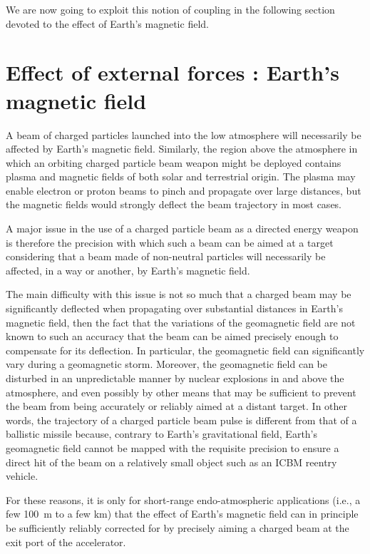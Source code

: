 \documentclass [12pt,a4paper,     ]{report} %
\begin{document}
We are now going to exploit this notion of coupling in the following section devoted to the effect of Earth's magnetic field.



\section{Effect of external forces : Earth's magnetic field}
\label{mag:0}

   A beam of charged particles launched into the low atmosphere will necessarily be affected by Earth's magnetic field.  Similarly, the region above the atmosphere in which an orbiting charged particle beam weapon might be deployed contains plasma and magnetic fields of both solar and terrestrial origin.  The plasma may enable electron or proton beams to pinch and propagate over large distances, but the magnetic fields would strongly deflect the beam trajectory in most cases.


   A major issue in the use of a charged particle beam as a directed energy weapon is therefore the precision with which such a beam can be aimed at a target considering that a beam made of non-neutral particles will necessarily be affected, in a way or another, by Earth's magnetic field. 

   The main difficulty with this issue is not so much that a charged beam may be  significantly deflected when propagating over substantial distances in Earth's magnetic field, then the fact that the variations of the geomagnetic field are not known to such an accuracy that the beam can be aimed precisely enough to compensate for its deflection.  In particular, the geomagnetic field can significantly vary during a geomagnetic storm.  Moreover, the geomagnetic field can be disturbed in an unpredictable manner by nuclear explosions in and above the atmosphere, and even possibly by other means that may be sufficient to prevent the beam from being accurately or reliably aimed at a distant target.  In other words, the trajectory of a charged particle beam pulse is different from that of a ballistic missile because, contrary to Earth's gravitational field, Earth's geomagnetic field cannot be mapped with the requisite precision to ensure a direct hit of the beam on a relatively small object such as an ICBM reentry vehicle.  

   For these reasons, it is only for short-range endo-atmospheric applications (i.e., a few 100~m to a few km) that the effect of Earth's magnetic field can in principle be sufficiently reliably corrected for by precisely aiming a charged beam at the exit port of the accelerator.
\end{document}
